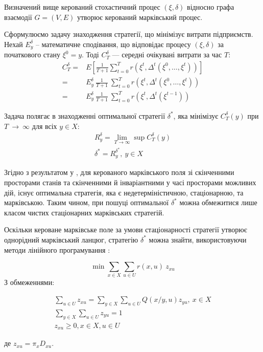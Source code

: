 \documentclass[oneside,draft,14pt]{extarticle}
\begin{document}
Визначений вище керований стохастичний процес \((\xi, \delta)\) відносно графа взаємодії \(G = (V, E)\) утворює керований марківський процес.





Сформулюємо задачу знаходження стратегії, що мінімізує витрати підприємств. Нехай \(E_y^\delta\) – математичне сподівання, що відповідає процесу \((\xi, \delta)\) за початкового стану \(\xi^0 = y\).  Тоді \(C_T^\delta\) — середні очікувані витрати за час \(T\):
\begin{align*}
C_T^{\delta} = &E\left[\frac{1}{T+1}\sum_{t=0}^T r(\xi^t, \Delta^t(\xi^0, \ldots, \xi^t))\right] \\
 = &E_y^\delta\ \frac{1}{T+1}\ \sum_{t=0}^T r(\xi^t, \Delta^t(\xi^0, \ldots, \xi^t)) \\
 = &E_y^\delta\ \frac{1}{T+1}\ \sum_{t=0}^T r(\xi^t, \Delta^t(\xi^{t-1}))
\end{align*}

Задача полягає в знаходженні оптимальної стратегії \(\delta^*\), яка мінімізує \(C_T^{\delta}(y)\) при \(T~\rightarrow~\infty\) для всіх \(y \in X\):
\begin{gather*}
R_y^\delta = \lim\limits_{T \rightarrow \infty} \sup C_T^{\delta}(y) \\
\delta^* = R_y^{\delta^*},\ y \in X
\end{gather*}

Згідно з результатом у \cite{Chornei:2005}, для керованого марківського поля зі скінченними просторами станів та скінченними й інваріантними у часі просторами можливих дій, існує оптимальна стратегія, яка є недетерміністичною, стаціонарною, та марківською. Таким чином, при пошуці оптимальної \(\delta^*\) можна обмежитися лише класом чистих стаціонарних марківських стратегій.

Оскільки кероване марківське поле за умови стаціонарності стратегії утворює однорідний марківський ланцюг, стратегію \(\delta^*\) можна знайти, використовуючи методи лінійного програмування \cite{Knopov:1998}:

\[\min \sum_{x \in X} \sum_{u \in U} r(x, u)\ z_{xu}\]
З обмеженнями:

\begin{gather*}
\sum_{u \in U} z_{xu} = \sum_{y \in X} \sum_{u \in U} Q(x/y, u) z_{yu},\: x \in X \\
\sum_{y \in X} \sum_{u \in U} z_{yu} = 1 \\
z_{xu} \geq 0, x \in X, u \in U
\end{gather*}

де \(z_{xu} = \pi_x D_{xu}\).

\clearpage


\nocite{David:1998}
\nocite{Knopov:2011}
\nocite{Knopov:1998}
\nocite{Chornei:2005}
\nocite{Koller:2009}



\end{document}
